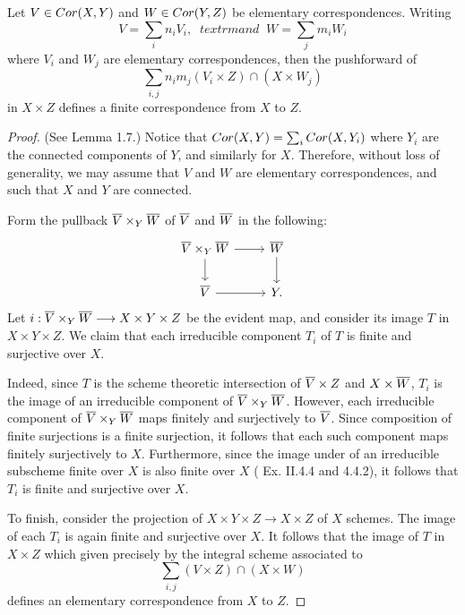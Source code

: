 \begin{lem}\label{lem_cor_composition}
Let $V \in Cor(X, Y)$ and $W \in Cor(Y, Z)$ be elementary 
correspondences. Writing
\[
V = \sum_i n_i V_i, \;\;textrm{and}\;\; W = \sum_j m_i W_i
\]
where $V_i$ and $W_j$ are elementary correspondences, then
the pushforward of
\[
\sum_{i, j} n_im_j (V_i \times Z) \cap (X \times W_j)
\]
in $X \times Z$ defines a finite correspondence from $X$ to $Z$.
\end{lem}
\begin{proof}(See \cite{MVW} Lemma 1.7.)
Notice that $Cor(X, Y) = \sum_i Cor(X, Y_i)$ where $Y_i$ are the 
connected components of $Y$, and similarly for $X$. Therefore, 
without loss of generality, we may assume that $V$ and $W$ are 
elementary correspondences, and such that $X$ and $Y$ are 
connected.

Form the pullback $\overline{V} \times_Y \overline{W}$ of $\overline{V}$ and
$\overline{W}$ in the following:
\[
\begin{tikzcd}
\Sch{V} \times_Y \Sch{W} \arrow{r} \arrow{d}
&\Sch{W} \arrow{d} \\
\Sch{V} \arrow{r}& Y.
\end{tikzcd}
\]
Let $i: \overline{V} \times_Y \overline{W} \longrightarrow X \times Y \times Z$ be the
evident map, and consider its image $T$ in $X \times Y \times Z$. 
We claim that each irreducible component $T_i$ of $T$ is finite 
and surjective over $X$. 

Indeed, since $T$ is the scheme theoretic intersection 
of $\overline{V} \times Z$ and $X \times \overline{W}$, $T_i$ is the image 
of an irreducible component of $\overline{V} \times_Y \overline{W}$. 
However, each irreducible component of $\overline{V} \times_Y \overline{W}$ 
maps finitely and surjectively to $\overline{V}$. Since composition of
finite surjections is a finite surjection, it follows that each
such component maps finitely surjectively to $X$. Furthermore, 
since the image under of an irreducible subscheme finite over $X$ is 
also finite over $X$ (\cite{Hart} Ex. II.4.4 and \cite{EGA3} 
4.4.2), it follows that $T_i$ is finite and surjective over $X$.

To finish, consider the projection of $X \times Y \times Z \to 
X \times Z$ of $X$ schemes. The image of each $T_i$ is again finite
and surjective over $X$. It follows that the image of $T$ in $X 
\times Z$ which given precisely by the integral scheme associated 
to
\[
\sum_{i, j} (V \times Z) \cap (X \times W)
\]
defines an elementary correspondence from $X$ to $Z$.
\end{proof}

